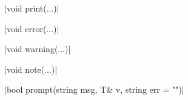 \funcitem \cppinline|void print(...)| 

\cppinline|void error(...)| 

\cppinline|void warning(...)| 

\cppinline|void note(...)| 

\funcitem \cppinline|bool prompt(string msg, T& v, string err = "")| 
